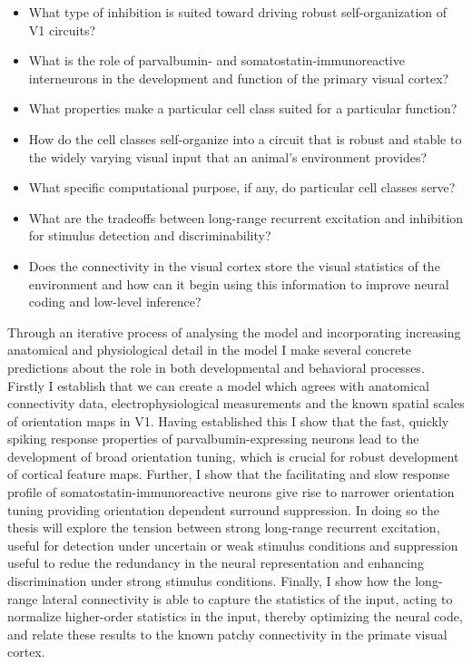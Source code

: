 \begin{itemize}
\item What type of inhibition is suited toward driving robust
  self-organization of V1 circuits?
\item What is the role of parvalbumin- and somatostatin-immunoreactive
  interneurons in the development and function of the primary visual
  cortex?
\item What properties make a particular cell class suited for a
  particular function?
\item How do the cell classes self-organize into a circuit that is
  robust and stable to the widely varying visual input that an
  animal's environment provides?
\item What specific computational purpose, if any, do particular cell
  classes serve?
\item What are the tradeoffs between long-range recurrent excitation
  and inhibition for stimulus detection and discriminability?
\item Does the connectivity in the visual cortex store the visual
  statistics of the environment and how can it begin using this
  information to improve neural coding and low-level inference?
\end{itemize}

Through an iterative process of analysing the model and incorporating
increasing anatomical and physiological detail in the model I make
several concrete predictions about the role in both developmental and
behavioral processes. Firstly I establish that we can create a model
which agrees with anatomical connectivity data, electrophysiological
measurements and the known spatial scales of orientation maps in V1.
Having established this I show that the fast, quickly spiking response
properties of parvalbumin-expressing neurons lead to the development
of broad orientation tuning, which is crucial for robust development
of cortical feature maps. Further, I show that the facilitating and
slow response profile of somatostatin-immunoreactive neurons give rise
to narrower orientation tuning providing orientation dependent
surround suppression. In doing so the thesis will explore the tension
between strong long-range recurrent excitation, useful for detection
under uncertain or weak stimulus conditions and suppression useful to
redue the redundancy in the neural representation and enhancing
discrimination under strong stimulus conditions. Finally, I show how
the long-range lateral connectivity is able to capture the statistics
of the input, acting to normalize higher-order statistics in the
input, thereby optimizing the neural code, and relate these results to
the known patchy connectivity in the primate visual cortex.

